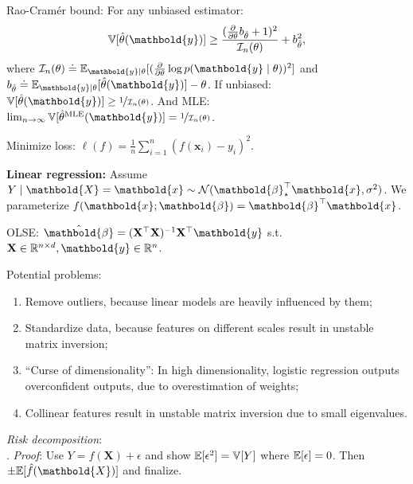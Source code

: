 \documentclass[9pt]{extarticle}
\newenvironment{topic}[1]
{\textbf{\sffamily \colorbox{black}{\rlap{\textbf{\textcolor{white}{#1}}}\hspace{\linewidth}\hspace{-2\fboxsep}}}}
{}
\newenvironment{subtopic}[1]
{\textbf{\sffamily #1:}}
{}
\renewcommand{\mat}[1]{\ensuremath{\mathbf{#1}}}
\renewcommand{\vec}[1]{\ensuremath{\mathbold{#1}}}
\renewcommand{\Var}{\mathbb{V}}
\begin{document}
\begin{multicols*}{3}
\begin{topic}{Density estimation}
        Rao-Cram\'er bound: For any unbiased estimator: \[
            \Var[\hat{\theta}(\vec{y})] \geq \frac{(\pdv*{b_{\hat{\theta}}}{\theta} + 1)^2}{\mathcal{I}_n(\theta)} + b^2_{\hat{\theta}},
        \]
        where $\mathcal{I}_n(\theta) \doteq \E_{\vec{y} \mid \theta}[(\pdv*{\log p(\vec{y} \mid
                    \theta)}{\theta})^2]$ and $b_{\hat{\theta}} \doteq \E_{\vec{y}\mid \theta}[\hat{\theta}(\vec{y})] -
            \theta$. If unbiased: $\Var[\hat{\theta}(\vec{y})] \geq \nicefrac{1}{\mathcal{I}_n(\theta)}$. And
        MLE: $\lim_{n\to \infty} \Var[\hat{\theta}^{\mathrm{MLE}}(\vec{y})] =
            \nicefrac{1}{\mathcal{I}_n(\theta)}$.
    \end{topic}

    \begin{topic}{Regression}
        Minimize loss: $\ell(f) = \frac{1}{n} \sum_{i=1}^{n} (f(\vec{x}_i) - y_i)^2$.

        \begin{subtopic}{Linear regression}
            Assume $Y \mid \vec{X} = \vec{x} \sim \mathcal{N}(\transpose{\vec{\beta}_\star} \vec{x},
                \sigma^2)$. We parameterize $f(\vec{x}; \vec{\beta}) = \transpose{\vec{\beta}} \vec{x}$.

            OLSE: $\hat{\vec{\beta}} = \inv{(\transpose{\mat{X}} \mat{X})} \transpose{\mat{X}} \vec{y}$ s.t.\
            $\mat{X} \in \R^{n \times d}, \vec{y} \in \R^n$.

            Potential problems:
            \begin{enumerate}[left=0pt]
                \item Remove outliers, because linear models are heavily influenced by them;
                \item Standardize data, because features on different scales result in unstable matrix inversion;
                \item ``Curse of dimensionality'': In high dimensionality, logistic regression
                      outputs overconfident outputs, due to overestimation of weights;
                \item Collinear features result in unstable matrix inversion due to small eigenvalues.
            \end{enumerate}

            \textit{Risk decomposition}:\\\scalebox{0.85}{$\E[(\hat{f}(\vec{X}) - Y)^2] = (\E[\hat{f}(\vec{X})] - \E[y])^2 + \Var[\hat{f}(\vec{X})] + \Var[y]$}.
            \textit{Proof}: Use $Y = f(\vec{X}) + \epsilon$ and show $\E[\epsilon^2] = \Var[Y]$ where $\mathbb{E}[\epsilon] = 0$. Then $\pm \E[\hat{f}(\vec{X})]$ and finalize.


\end{subtopic}
\end{topic}
\end{multicols*}
\end{document}
